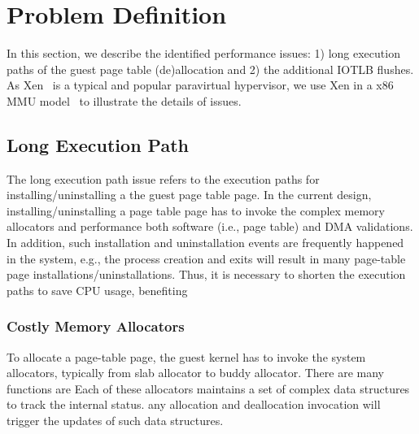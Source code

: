 \section{Problem Definition} \label{sec:prob}
In this section, we describe the identified performance issues: 1) long execution paths of the guest page table (de)allocation and 2) the additional IOTLB flushes.
As Xen~\cite{XEN-SOSP03} is a typical and popular paravirtual hypervisor, we use Xen in a x86 MMU model~\cite{x86-pv-model} to illustrate the details of issues. 

\subsection{Long Execution Path}\label{sec:longpath}
The long execution path issue refers to the execution paths for installing/uninstalling a the guest page table page.
In the current design, installing/uninstalling a page table page has to invoke the complex memory allocators and performance both software (i.e., page table) and DMA validations.
In addition, such installation and uninstallation events are frequently happened in the system, e.g., the process creation and exits will result in many page-table page installations/uninstallations.
Thus, it is necessary to shorten the execution paths to save CPU usage, benefiting 

 
\subsubsection{Costly Memory Allocators}
To allocate a page-table page, the guest kernel has to invoke the system allocators, typically from slab allocator to buddy allocator.
There are many functions are 
Each of these allocators maintains a set of complex data structures to track the internal status.
any allocation and deallocation invocation will trigger the updates of such data structures. 

